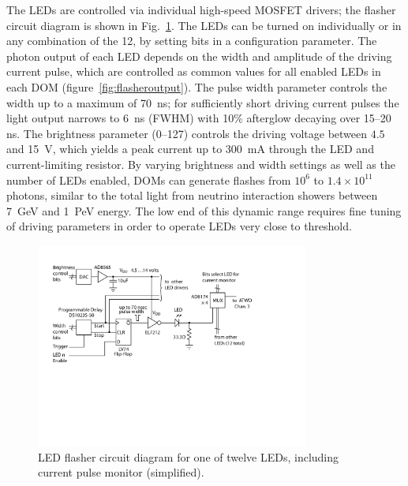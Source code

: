 The LEDs are controlled via individual high-speed MOSFET drivers; the
flasher circuit diagram is shown in Fig.~\ref{fig:flasherdiagram}. The LEDs can be turned on individually or in any
combination of the 12, by setting bits in a configuration parameter.
The photon output of each LED depends on the width and
amplitude of the driving current pulse, which are controlled as common
values for all enabled LEDs in each DOM (figure~\ref{fig:flasheroutput}).  
The pulse width parameter controls the width up to a maximum of \qty{70}{ns}; 
for sufficiently short driving current pulses the light output narrows to \qty{6}{ns} (FWHM) with
10\% afterglow decaying over 15--20 ns. The brightness parameter (0--127) controls the driving voltage between
$4.5$ and \qty{15}{V}, which yields a peak current up to
\qty{300}{mA} through the LED and current-limiting resistor.
By varying brightness and width settings as well as the number of LEDs enabled, DOMs can generate flashes
from $10^6$ to $1.4\times10^{11}$ photons, similar to the total light from
neutrino interaction showers between \qty{7}{GeV} and \qty{1}{PeV} energy.
The low end of this dynamic range requires fine tuning of driving
parameters in order to operate LEDs very close to threshold.

\begin{figure}[h]
 \centering
 \includegraphics[width=0.8\textwidth]{graphics/dom/functional/domfig4-FlasherDiagram.pdf}
 \caption{LED flasher circuit diagram for one of twelve LEDs, including current pulse monitor (simplified).}
 \label{fig:flasherdiagram}
\end{figure}

